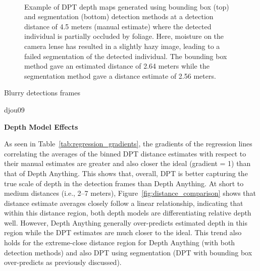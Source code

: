 \begin{figure}[htbp]
    \centering
    \\[1mm]
    \caption{Example of DPT depth maps generated using bounding box (top) and segmentation
        (bottom) detection methods at a detection distance of 4.5 meters (manual estimate)
        where the detected individual is partially occluded by foliage. Here, moisture on the
        camera lense has resulted in a slightly hazy image, leading to a failed segmentation
        of the detected individual. The bounding box method gave an estimated distance of
        2.64 meters while the segmentation method gave a distance estimate of 2.56 meters.}
    \label{fig:haze_occluded}
\end{figure}


Blurry detections frames

djou09

\vspace{5mm}
\textbf{Depth Model Effects}

As seen in Table~\ref{tab:regression_gradients}, the gradients of the regression lines
correlating the averages of the binned DPT distance estimates with respect to their manual
estimates are greater and also closer the ideal (gradient = 1) than that of Depth Anything.
This shows that, overall, DPT is better capturing the true scale of depth in the detection
frames than Depth Anything.
At short to medium distances (i.e., 2–7 meters), Figure~\ref{fig:distance_comparison} shows
that distance estimate averages closely follow a linear relationship, indicating that within
this distance region, both depth models are differentiating relative depth well.
However, Depth Anything generally over-predicts estimated depth in this region while the DPT
estimates are much closer to the ideal.
This trend also holds for the extreme-close distance region for Depth Anything (with both
detection methods) and also DPT using segmentation (DPT with bounding box over-predicts as
previously discussed).

